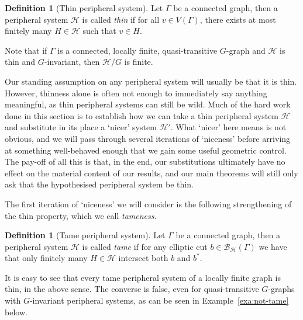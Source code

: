 \documentclass[11pt,a4paper]{amsart}
\theoremstyle{definition}
\newtheorem{definition}[theorem]{Definition}
\newcommand{\per}{\mathcal{H}}
\newcommand{\br}{{\mathscr{B}}}
\begin{document}
\begin{definition}[Thin peripheral system]\label{def:thin}
    Let $\Gamma$ be a connected graph, then a peripheral system $\per$ is called \emph{thin} if for all $v \in V(\Gamma)$, there exists at most finitely many $H \in \per$ such that $v \in H$.
\end{definition}

Note that if $\Gamma$ is a connected, locally finite, quasi-transitive $G$-graph and $\per$ is thin and $G$-invariant, then $\per/G$ is finite. 

Our standing assumption on any peripheral system will usually be that it is thin. However, thinness alone is often not enough to immediately say anything meaningful, as thin peripheral systems can still be wild.
Much of the hard work done in this section is to establish how we can take a thin peripheral system $\per$ and substitute in its place a `nicer' system $\per'$. What `nicer' here means is not obvious, and we will pass through several iterations of `niceness' before arriving at something well-behaved enough that we gain some useful geometric control. The pay-off of all this is that, in the end, our substitutions ultimately have no effect on the material content of our results, and our main theorems will still only ask that the hypothesised peripheral system be thin. 

The first iteration of `niceness' we will consider is the following strengthening of the thin property, which we call \emph{tameness}. 

\begin{definition}[Tame peripheral system]
    Let $\Gamma$ be a connected graph, then a peripheral system $\per$ is called \emph{tame} if for any elliptic cut $b \in \br _\per (\Gamma)$ we have that only finitely many $H \in \per$ intersect both $b$ and $b^\ast$. 
\end{definition}



It is easy to see that every tame peripheral system of a locally finite graph is thin, in the above sense. The converse is false, even for quasi-transitive $G$-graphs with $G$-invariant peripheral systems, as can be seen in Example~\ref{exa:not-tame} below. 
\end{document}

